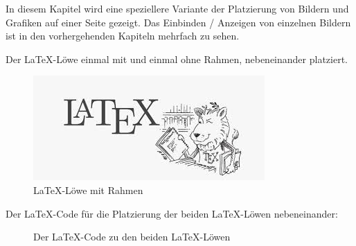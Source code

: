 In diesem Kapitel wird eine speziellere Variante der Platzierung von Bildern und Grafiken auf einer Seite gezeigt. Das Einbinden / Anzeigen von einzelnen Bildern ist in den vorhergehenden Kapiteln mehrfach zu sehen.

\vfill

Der \LaTeX-Löwe einmal mit und einmal ohne Rahmen, nebeneinander platziert. 

\begin{figure}[htb]
    \centering
    \begin{minipage}[t]{0.45\linewidth}
        \centering
        \includegraphics[width=0.9\linewidth]{./Bilder/LaTeX.jpg}
        \caption{\LaTeX-Löwe ohne Rahmen}
    \end{minipage}
    \hfill
    \begin{minipage}[t]{0.45\linewidth}
        \centering
        \caption{\LaTeX-Löwe mit Rahmen}
    \end{minipage}
\end{figure}

\vfill

Der \LaTeX-Code für die Platzierung der beiden \LaTeX-Löwen nebeneinander:

\begin{figure}[h!]
    \centering
      \caption{Der \LaTeX-Code zu den beiden \LaTeX-Löwen}
\end{figure}

